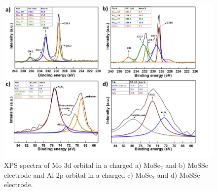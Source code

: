 \documentclass[num-refs]{wiley-article}
\begin{document}
\begin{figure}[h!]
\centering
\includegraphics[width=\textwidth]{figures/fig4}
\caption{XPS spectra of Mo 3d orbital in a charged a) MoSe$_2$ and b) MoSSe electrode and Al 2p orbital in a charged c) MoSe$_2$ and d) MoSSe electrode.}
\end{figure}
\end{document}
